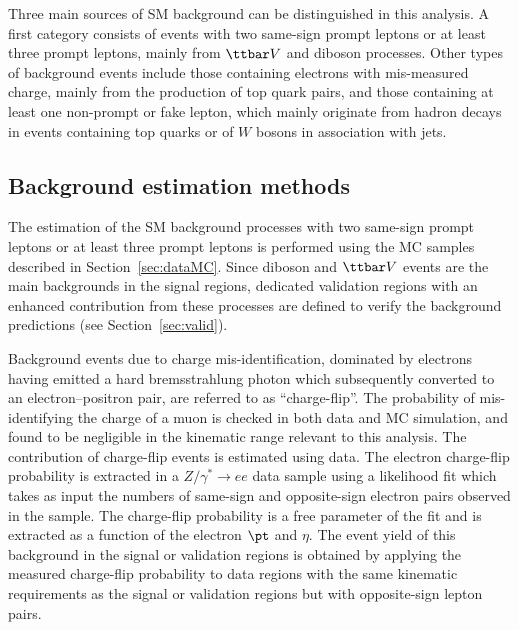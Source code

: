 Three main sources of SM background can be distinguished in this analysis. 
A first category consists of events with two same-sign prompt leptons or at least three prompt leptons, 
mainly from $\ttbar V$ and diboson processes. 
Other types of background events include those containing electrons with mis-measured charge, mainly from the production of top quark pairs, 
and those containing at least one non-prompt or fake lepton, 
which mainly originate from hadron decays in events containing top quarks or of $W$ bosons in association with jets. 

\subsection{Background estimation methods} 

The estimation of the SM background processes with two same-sign prompt leptons or at least three prompt leptons 
is performed using the MC samples described in Section~\ref{sec:dataMC}. 
Since diboson and $\ttbar V$ events are the main backgrounds in the signal regions, 
dedicated validation regions with an enhanced contribution from these processes 
are defined to verify the background predictions (see Section~\ref{sec:valid}).

Background events due to charge mis-identification, dominated by electrons having emitted 
a hard brems\-strah\-lung photon which subsequently converted to an electron--positron pair, 
are referred to as “charge-flip”. 
The probability of mis-identifying the charge of a muon is checked in both data and MC simulation, 
and found to be negligible in the kinematic range relevant to this analysis.
The contribution of charge-flip events is estimated using data. 
The electron charge-flip probability is extracted in a $Z/\gamma^{*}\to ee$ data sample using a likelihood fit 
which takes as input the numbers of same-sign and opposite-sign electron pairs observed in the sample. 
The charge-flip probability is a free parameter of the fit and is extracted as a function of the electron $\pt$ and $\eta$. 
The event yield of this background in the signal or validation regions is obtained by applying the measured charge-flip probability 
to data regions with the same kinematic requirements as the signal or validation regions but with opposite-sign lepton pairs. 


